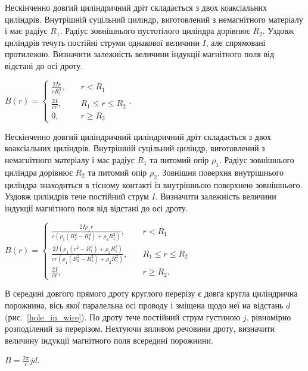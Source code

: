 \begin{problem}
Нескінченно довгий циліндричний дріт складається з двох коаксіальних циліндрів. Внутрішній суцільний циліндр, виготовлений з немагнітного матеріалу  і має радіус $R_1$. Радіус зовнішнього пустотілого циліндра дорівнює $R_2$. Уздовж циліндрів течуть постійні струми однакової величини $I$, але спрямовані протилежно. Визначити залежність величини індукції магнітного поля від відстані до осі дроту.
\begin{solution}
	$B(r) = %
		\begin{cases}
			\frac{2Ir}{cR_1^2}, & \quad r < R_1           \\
			\frac{2I}{cr},      & \quad R_1 \le r \le R_2 \\
			0,                  & \quad r \ge R_2
		\end{cases}
	$.
\end{solution}
\end{problem}

\begin{problem}
Нескінченно довгий циліндричний циліндричний дріт складається з двох коаксіальних циліндрів. Внутрішній суцільний циліндр, виготовлений з немагнітного матеріалу  і має радіус $R_1$ та питомий опір $\rho_1$. Радіус зовнішнього циліндра дорівнює $R_2$ та питомий опір $\rho_2$. Зовнішня поверхня внутрішнього циліндра знаходиться в тісному контакті із внутрішньою поверхнею зовнішнього. Уздовж циліндрів тече постійний струм $I$. Визначити залежність величини індукції магнітного поля від відстані до осі дроту.
\begin{solution}
	$B(r) = %
		\begin{cases}
			\frac{2I\rho_1r}{c(\rho_1(R_2^2 - R_1^2) + \rho_2R_1^2)}, & \quad r < R_1           \\
			\frac{2I(\rho_1(r^2 - R_1^2) + \rho_2R_1^2)}{cr(\rho_1(R_2^2 - R_1^2) + \rho_2R_1^2)},      & \quad R_1 \le r \le R_2 \\
			\frac{2I}{cr},                  & \quad r \ge R_2.
		\end{cases}
	$
\end{solution}
\end{problem}

\begin{problem}\label{prb:hole_in_wire}
В середині довгого прямого дроту круглого перерізу є довга кругла циліндрична порожнина, вісь якої паралельна осі проводу і зміщена щодо неї на відстань $d$ (рис.~\ref{hole_in_wire}). По дроту тече постійний струм густиною $j$, рівномірно розподілений за перерізом. Нехтуючи впливом речовини дроту, визначити величину індукції магнітного поля всередині порожнини.
\begin{solution}
	$B = \frac{2\pi}{c} jd$.
\end{solution}
\end{problem}

